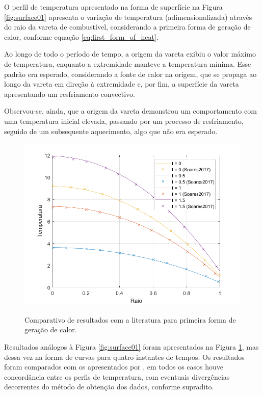 O perfil de temperatura apresentado na forma de superfície na Figura \ref{fig:surface01} apresenta o variação de temperatura (adimensionalizada) através do raio da vareta de combustível, considerando a primeira forma de geração de calor, conforme equação \ref{eq:first_form_of_heat}.

Ao longo de todo o período de tempo, a origem da vareta exibiu o valor máximo de temperatura, enquanto a extremidade manteve a temperatura mínima. Esse padrão era esperado, considerando a fonte de calor na origem, que se propaga ao longo da vareta em direção à extremidade e, por fim, a superfície da vareta apresentando um resfriamento convectivo.

Observou-se, ainda, que a origem da vareta demonstrou um comportamento com uma temperatura inicial elevada, passando por um processo de resfriamento, seguido de um subsequente aquecimento, algo que não era esperado.

\begin{figure}[H]
    \centering
    \caption{Comparativo de resultados com a literatura para primeira forma de geração de calor.}    
    \includegraphics[scale=0.5]{figures/results/Fig03.png}
    \label{fig:profile01}
\end{figure}

Resultados análogos à Figura \ref{fig:surface01} foram apresentados na Figura \ref{fig:profile01}, mas dessa vez na forma de curvas para quatro instantes de tempos. Os resultados foram comparados com os apresentados por \citet{soares2017}, em todos os casos houve concordância entre os perfis de temperatura, com eventuais divergências decorrentes do método de obtenção dos dados, conforme supradito.

